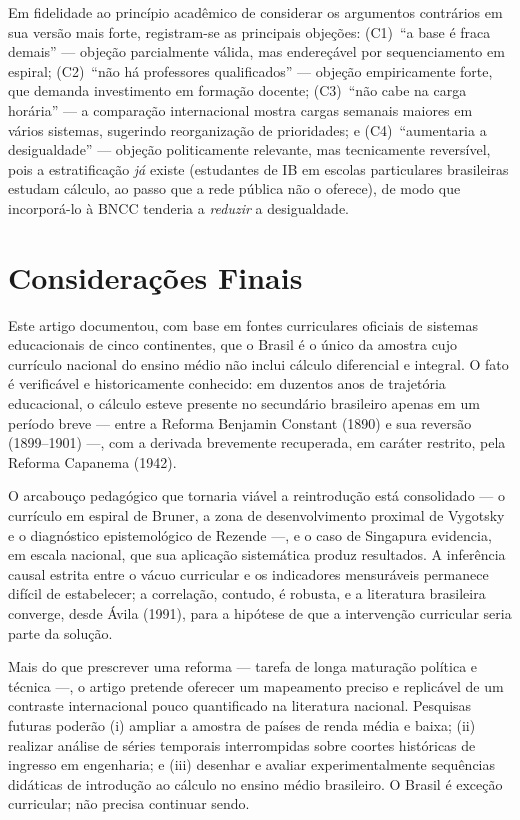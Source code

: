 \documentclass[12pt,a4paper,oneside]{article}
\begin{document}
Em fidelidade ao princípio acadêmico de considerar os argumentos
contrários em sua versão mais forte, registram-se as principais objeções:
(C1)~``a base é fraca demais'' --- objeção parcialmente válida, mas
endereçável por sequenciamento em espiral; (C2)~``não há professores
qualificados'' --- objeção empiricamente forte, que demanda investimento
em formação docente; (C3)~``não cabe na carga horária'' --- a comparação
internacional mostra cargas semanais maiores em vários sistemas,
sugerindo reorganização de prioridades; e (C4)~``aumentaria a
desigualdade'' --- objeção politicamente relevante, mas tecnicamente
reversível, pois a estratificação \emph{já} existe (estudantes de IB em
escolas particulares brasileiras estudam cálculo, ao passo que a rede
pública não o oferece), de modo que incorporá-lo à BNCC tenderia a
\emph{reduzir} a desigualdade.

\section{Considerações Finais}

Este artigo documentou, com base em fontes curriculares oficiais de
sistemas educacionais de cinco continentes, que o Brasil é o único da
amostra cujo currículo nacional do ensino médio não inclui cálculo
diferencial e integral. O fato é verificável e historicamente conhecido:
em duzentos anos de trajetória educacional, o cálculo esteve presente no
secundário brasileiro apenas em um período breve --- entre a Reforma
Benjamin Constant (1890) e sua reversão (1899--1901) ---, com a derivada
brevemente recuperada, em caráter restrito, pela Reforma Capanema (1942).

O arcabouço pedagógico que tornaria viável a reintrodução está
consolidado --- o currículo em espiral de Bruner, a zona de
desenvolvimento proximal de Vygotsky e o diagnóstico epistemológico de
Rezende ---, e o caso de Singapura evidencia, em escala nacional, que sua
aplicação sistemática produz resultados. A inferência causal estrita
entre o vácuo curricular e os indicadores mensuráveis permanece difícil
de estabelecer; a correlação, contudo, é robusta, e a literatura
brasileira converge, desde Ávila (1991), para a hipótese de que a
intervenção curricular seria parte da solução.

Mais do que prescrever uma reforma --- tarefa de longa maturação política
e técnica ---, o artigo pretende oferecer um mapeamento preciso e
replicável de um contraste internacional pouco quantificado na literatura
nacional. Pesquisas futuras poderão (i) ampliar a amostra de países de
renda média e baixa; (ii) realizar análise de séries temporais
interrompidas sobre coortes históricas de ingresso em engenharia; e
(iii) desenhar e avaliar experimentalmente sequências didáticas de
introdução ao cálculo no ensino médio brasileiro. O Brasil é exceção
curricular; não precisa continuar sendo.
\end{document}
